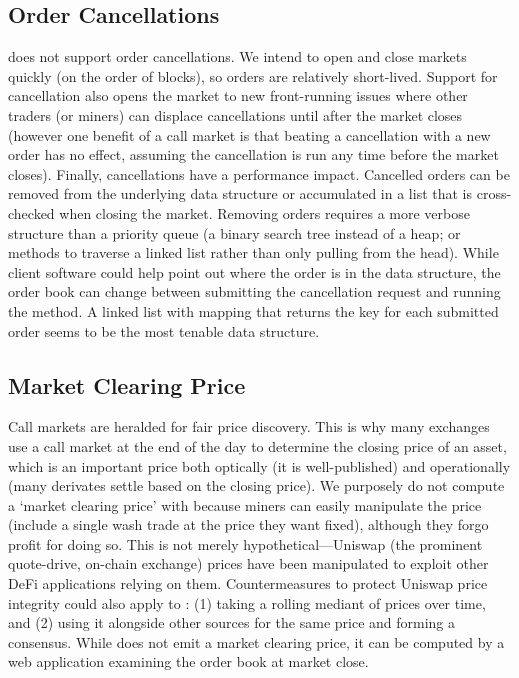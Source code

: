 \subsection{Order Cancellations}

\cm does not support order cancellations. We intend to open and close markets quickly (on the order of blocks), so orders are relatively short-lived. Support for cancellation also opens the market to new front-running issues where other traders (or miners) can displace cancellations until after the market closes (however one benefit of a call market is that beating a cancellation with a new order has no effect, assuming the cancellation is run any time before the market closes). Finally, cancellations have a performance impact. Cancelled orders can be removed from the underlying data structure   or accumulated in a list that is cross-checked when closing the market. Removing orders requires a more verbose structure than a priority queue (\eg a binary search tree instead of a heap; or methods to traverse a linked list rather than only pulling from the head). While client software could help point out where the order is in the data structure, the order book can change between submitting the cancellation request and running the method. A linked list with mapping that returns the key for each submitted order seems to be the most tenable data structure. 

\subsection{Market Clearing Price}

Call markets are heralded for fair price discovery. This is why many exchanges use a call market at the end of the day to determine the closing price of an asset, which is an important price both optically (it is well-published) and operationally (many derivates settle based on the closing price). We purposely do not compute a `market clearing price' with \cm because miners can easily manipulate the price (\ie include a single wash trade at the price they want fixed), although they forgo profit for doing so. This is not merely hypothetical---Uniswap (the prominent quote-drive, on-chain exchange) prices have been manipulated to exploit other DeFi applications relying on them. Countermeasures to protect Uniswap price integrity could also apply to \cm: (1) taking a rolling mediant of prices over time, and (2) using it alongside other sources for the same price and forming a consensus. While \cm does not emit a market clearing price, it can be computed by a web application examining the order book at market close. 


